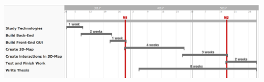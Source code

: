 \documentclass[a4paper]{article}
\begin{document}
\hspace*{-1cm}\includegraphics[scale=0.4]{Plan_timeline}
\end{document}
